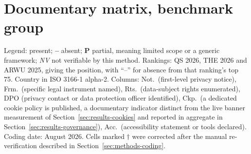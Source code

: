 %
%
%

\newcommand{\si}{\ding{51}}                     %
\newcommand{\no}{\textcolor{gris}{\textbf{--}}} %
\newcommand{\pc}{\textbf{P}}                    %
\newcommand{\nv}{\textsl{\footnotesize NV}}     %

\section{Documentary matrix, benchmark group}\label{ap:mundo}
\setcounter{table}{0}\setcounter{figure}{0}

Legend: \si{} present; \no{} absent; \textbf{P} partial, meaning limited scope or a generic framework; \nv{} not verifiable by this method. Rankings: QS 2026, THE 2026 and ARWU 2025, giving the position, with ``--'' for absence from that ranking's top 75. Country in ISO 3166-1 alpha-2. Columns: Not.\ (first-level privacy notice), Frm.\ (specific legal instrument named), Rts.\ (data-subject rights enumerated), DPO (privacy contact or data protection officer identified), Ckp.\ (a dedicated cookie policy is published, a documentary indicator distinct from the live banner measurement of Section~\ref{sec:results-cookies} and reported in aggregate in Section~\ref{sec:results-governance}), Acc.\ (accessibility statement or tools declared). Coding date: August 2026. Cells marked $\dagger$ were corrected after the manual re-verification described in Section~\ref{sec:methods-coding}.


